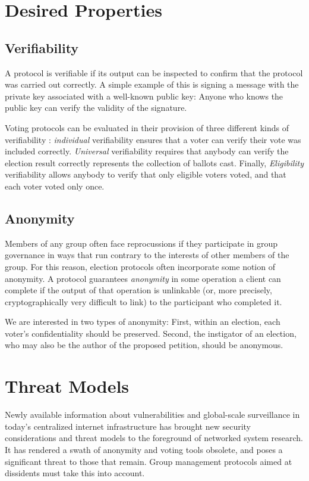 \section{Desired Properties}
  \subsection{Verifiability}\label{Subsection:verif}
  A protocol is verifiable if its output can be inspected to confirm that the
  protocol was carried out correctly. A simple example of this is signing a
  message with the private key associated with a well-known public key: Anyone
  who knows the public key can verify the validity of the signature.

  Voting protocols can be evaluated in their provision of three different
  kinds of verifiability \cite{kremer_election_2010}: \emph{individual}
  verifiability ensures that a voter can verify their vote was included
  correctly. \emph{Universal} verifiability requires that anybody can verify
  the election result correctly represents the collection of ballots cast.
  Finally, \emph{Eligibility} verifiability allows anybody to verify that
  only eligible voters voted, and that each voter voted only once.


  \subsection{Anonymity}\label{Subsection:anon}
  Members of any group often face reprocussions if they participate in group
  governance in ways that run contrary to the interests of other members of
  the group. For this reason, election protocols often incorporate some notion
  of anonymity. A protocol guarantees \emph{anonymity} in some operation a
  client can complete if the output of that operation is unlinkable (or, more
  precisely, cryptographically very difficult to link) to the participant who
  completed it\cite{ford_hiding_2014}.

  We are interested in two types of anonymity: First, within an election,
  each voter's confidentiality should be preserved. Second, the instigator of an
  election, who may also be the author of the proposed petition, should be
  anonymous.

  \section{Threat Models}\label{Section:threats}
  Newly available information about vulnerabilities and global-scale
  surveillance in today's centralized internet infrastructure has brought new
  security considerations and threat models to the foreground of networked
  system research. It has rendered a swath of anonymity and voting tools
  obsolete, and poses a significant threat to those that remain. Group
  management protocols aimed at dissidents must take this into account.

